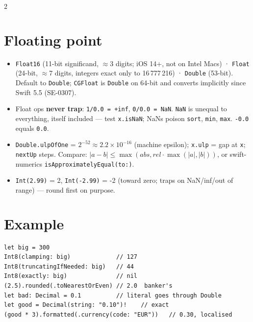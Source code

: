 \documentclass[8pt]{extarticle}
\begin{document}
\begin{multicols}{2}
\section{Floating point}
\begin{itemize}
  \item \texttt{Float16} (11-bit significand, $\approx$3 digits; iOS 14+, not
        on Intel Macs) · \texttt{Float} (24-bit, $\approx$7 digits, integers
        exact only to 16\,777\,216) · \texttt{Double} (53-bit). Default to
        \texttt{Double}; \texttt{CGFloat} is \texttt{Double} on 64-bit and
        converts implicitly since Swift 5.5 (SE-0307).
  \item Float ops \textbf{never trap}: \texttt{1/0.0 = +inf},
        \texttt{0/0.0 = NaN}. \texttt{NaN} is unequal to everything,
        itself included — test \texttt{x.isNaN}; NaNs poison \texttt{sort},
        \texttt{min}, \texttt{max}. \texttt{-0.0} equals \texttt{0.0}.
  \item \texttt{Double.ulpOfOne} = $2^{-52}\approx 2.2\times10^{-16}$ (machine
        epsilon); \texttt{x.ulp} = gap at \texttt{x}; \texttt{nextUp} steps.
        Compare: $|a-b| \le \max(\mathit{abs}, \mathit{rel}\cdot\max(|a|,|b|))$,
        or swift-numerics \texttt{isApproximatelyEqual(to:)}.
  \item \texttt{Int(2.99)} = 2, \texttt{Int(-2.99)} = -2 (toward zero; traps
        on NaN/inf/out of range) — round first on purpose.
\end{itemize}

\section{Example}
\begin{lstlisting}[language=SwiftSheet]
let big = 300
Int8(clamping: big)             // 127
Int8(truncatingIfNeeded: big)   // 44
Int8(exactly: big)              // nil
(2.5).rounded(.toNearestOrEven) // 2.0  banker's
let bad: Decimal = 0.1          // literal goes through Double
let good = Decimal(string: "0.10")!    // exact
(good * 3).formatted(.currency(code: "EUR"))   // 0.30, localised
\end{lstlisting}

\columnbreak


\end{multicols}
\end{document}
